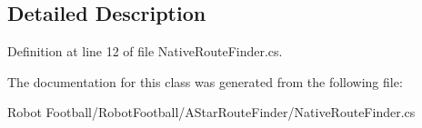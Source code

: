 \subsection{Detailed Description}


Definition at line 12 of file Native\-Route\-Finder.\-cs.



The documentation for this class was generated from the following file\-:\begin{DoxyCompactItemize}
\item 
Robot Football/\-Robot\-Football/\-A\-Star\-Route\-Finder/Native\-Route\-Finder.\-cs\end{DoxyCompactItemize}
